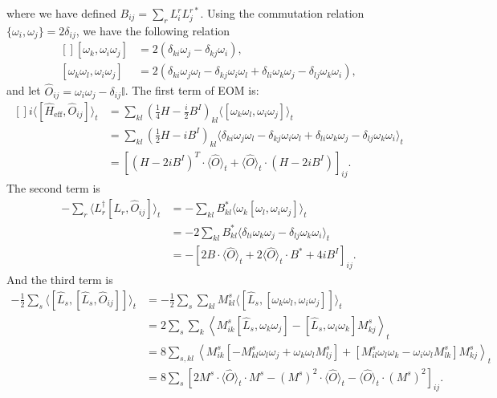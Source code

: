 \documentclass[aps,prb,superscriptaddress,nofootinbib]{revtex4}
\begin{document}
where we have defined $B_{ij} = \sum_r L^r_i L^{r*}_j$.
Using the commutation relation $\{\omega_i, \omega_j\} = 2\delta_{ij}$, we have the following relation
\begin{equation}
\begin{aligned}[]
	[\omega_k,\omega_i \omega_j] &= 2(\delta_{ki}\omega_j-\delta_{kj}\omega_i), \\
	[\omega_k \omega_l, \omega_i \omega_j] 
	&= 2(\delta_{ki}\omega_j \omega_l-\delta_{kj} \omega_i \omega_l + \delta_{li}\omega_k \omega_j - \delta_{lj}\omega_k\omega_i),
\end{aligned}
\end{equation}
and let $\hat O_{ij} = \omega_i\omega_j - \delta_{ij}\mathbb I$.
The first term of EOM is:
\begin{equation*}
\begin{aligned}[]
	i\langle[\hat H_{\mathrm{eff}}, \hat O_{ij}]\rangle_t
	&= \sum_{kl}\left(\frac{1}{4}H-\frac{i}{2}B^I \right)_{kl} \langle[\omega_k \omega_l, \omega_i \omega_j]\rangle_t \\
	&= \sum_{kl} \left(\frac{1}{2}H-i B^I\right)_{kl} \langle 
		\delta_{ki}\omega_j \omega_l-\delta_{kj} \omega_i \omega_l + 
		\delta_{li}\omega_k \omega_j - \delta_{lj}\omega_k\omega_i
	\rangle_t \\
	&= \left[
		(H-2iB^I)^T \cdot \langle\hat O\rangle_t + 
		\langle\hat O\rangle_t \cdot (H-2iB^I)
	\right]_{ij}.
\end{aligned}
\end{equation*}
The second term is
\begin{equation*}
\begin{aligned}
	-\sum_r \langle L_r^\dagger[L_r, \hat O_{ij}] \rangle_t
	&= -\sum_{kl} B_{kl}^* \langle \omega_k [\omega_l, \omega_i \omega_j] \rangle_t \\
	&= -2\sum_{kl} B_{kl}^* \langle 
		\delta_{li} \omega_k \omega_j - 
		\delta_{lj} \omega_k \omega_i
	\rangle_t \\
	&= -\left[2B\cdot \langle\hat O\rangle_t + 2\langle\hat O\rangle_t\cdot B^* + 4i B^I \right]_{ij}.
\end{aligned}
\end{equation*}
And the third term is
\begin{equation*}
\begin{aligned}
	-\frac{1}{2}\sum_s \langle[\hat L_s,[\hat L_s, \hat O_{ij}]]\rangle_t
	&= -\frac{1}{2} \sum_s \sum_{kl} M^s_{kl}\langle[\hat L_s,[\omega_k \omega_l, \omega_i \omega_j]]\rangle_t \\
	&= 2\sum_s \sum_{k} \left\langle M^s_{ik}[\hat L_s,\omega_k \omega_j]-[\hat L_s,\omega_i \omega_k]M^s_{kj} \right\rangle_t \\
	&= 8\sum_{s,kl} \left\langle M^s_{ik}[-M^s_{kl}\omega_l\omega_j+\omega_k\omega_l M^s_{lj}]+[M^s_{il}\omega_l\omega_k-\omega_i\omega_l M^s_{lk}]M^s_{kj} \right\rangle_t \\
	&= 8\sum_s \left[2 M^s \cdot \langle\hat O\rangle_t\cdot M^s-(M^s)^2 \cdot \langle\hat O\rangle_t - \langle\hat O\rangle_t\cdot(M^s)^2 \right]_{ij}.
\end{aligned}
\end{equation*}
\end{document}
